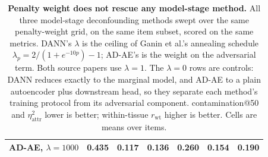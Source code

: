 \begin{table}[t]
\begin{tabular}{l ccc ccc}
    \quad AD-AE, $\lambda=1000$ & 0.435 & 0.117 & 0.136 & 0.260 & 0.154 & 0.190 \\
    \bottomrule
  \end{tabular}
  \caption{\textbf{Penalty weight does not rescue any model-stage method.} All three model-stage deconfounding methods swept over the same penalty-weight grid, on the same item subset, scored on the same metrics. DANN's $\lambda$ is the ceiling of Ganin et al.'s annealing schedule $\lambda_p = 2/(1+e^{-10p})-1$; AD-AE's is the weight on the adversarial term. Both source papers use $\lambda=1$. The $\lambda=0$ rows are controls: DANN reduces exactly to the marginal model, and AD-AE to a plain autoencoder plus downstream head, so they separate each method's training protocol from its adversarial component. contamination@50 and $\eta^2_{\mathrm{attr}}$ lower is better; within-tissue $r_{\mathrm{wt}}$ higher is better. Cells are means over items.}
  \label{tab:adv_sweep}
\end{table}
